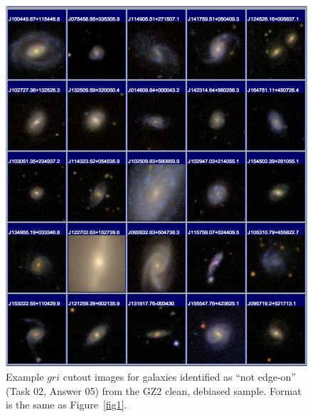 \documentclass[useAMS,usenatbib]{mn2e}
\begin{document}
\newpage
\clearpage
\begin{figure}
\includegraphics[angle=0,width=7.0in]{figures/gallery/notedgeon.png}
\caption{Example $gri$ cutout images for galaxies identified as ``not edge-on'' (Task 02, Answer 05) from the GZ2 clean, debiased sample. Format is the same as Figure~\ref{fig1}.}
\end{figure}
\end{document}
